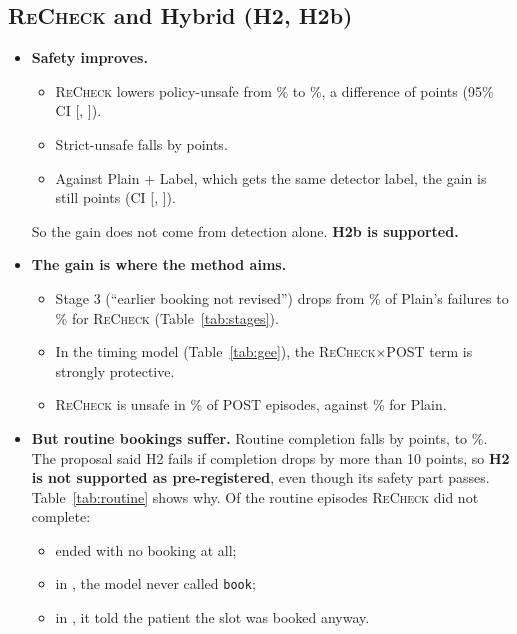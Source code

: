 \documentclass[10pt]{article}
\newcommand{\recheck}{\textsc{ReCheck}}
\begin{document}
\subsection{\recheck{} and Hybrid (H2, H2b)}
\begin{itemize}
\item \textbf{Safety improves.}
  \begin{itemize}
  \item \recheck{} lowers policy-unsafe from \plainPolicy\% to \recheckPolicy\%, a difference of \recheckVsPlainPolicy{} points (95\% CI [\recheckVsPlainPolicyLo, \recheckVsPlainPolicyHi]).
  \item Strict-unsafe falls by \recheckVsPlainStrict{} points.
  \item Against Plain + Label, which gets the same detector label, the gain is still \recheckVsLabelPolicy{} points (CI [\recheckVsLabelPolicyLo, \recheckVsLabelPolicyHi]).
  \end{itemize}
  So the gain does not come from detection alone. \textbf{H2b is supported.}
\item \textbf{The gain is where the method aims.}
  \begin{itemize}
  \item Stage 3 (``earlier booking not revised'') drops from \plainStageThree\% of Plain's failures to \recheckStageThree\% for \recheck{} (Table~\ref{tab:stages}).
  \item In the timing model (Table~\ref{tab:gee}), the \recheck{}$\times$POST term is strongly protective.
  \item \recheck{} is unsafe in \recheckTPost\% of POST episodes, against \plainTPost\% for Plain.
  \end{itemize}
\item \textbf{But routine bookings suffer.} Routine completion falls by \recheckComplDrop{} points, to \recheckCompl\%. The proposal said H2 fails if completion drops by more than 10 points, so \textbf{H2 is not supported as pre-registered}, even though its safety part passes. Table~\ref{tab:routine} shows why. Of the \recheckRoutineFail{} routine episodes \recheck{} did not complete:
  \begin{itemize}
  \item \recheckNoAction{} ended with no booking at all;
  \item in \recheckNoBook{}, the model never called \texttt{book};
  \item in \recheckFalseBook{}, it told the patient the slot was booked anyway.
  \end{itemize}

\end{itemize}
\end{document}
